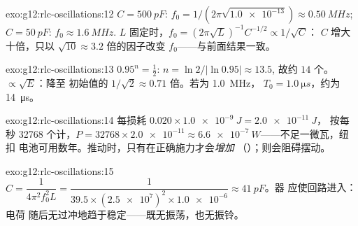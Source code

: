 \begin{solution}{exo:g12:rlc-oscillations:12}
$C = \qty{500}{pF}$: $f_0 = 1/(2\pi\sqrt{\num{1.0e-13}}) \approx
\qty{0.50}{MHz}$; $C = \qty{50}{pF}$: $f_0 \approx \qty{1.6}{MHz}$.
$L$ 固定时，$f_0 = (2\pi\sqrt{L})^{-1} C^{-1/2} \propto 1/\sqrt{C}$：
$C$ 增大十倍，只以 $\sqrt{10} \approx 3.2$ 倍的因子改变 $f_0$——与前面结果一致。
\end{solution}

\begin{solution}{exo:g12:rlc-oscillations:13}
$0.95^n = \tfrac12$: $n = \ln 2/\lvert\ln 0.95\rvert \approx 13.5$,
故约 $14$ 个。 $\propto \sqrt{E}$：降至
初始值的 $1/\sqrt{2} \approx 0.71$ 倍。若为 \qty{1.0}{MHz}，
$T_0 = \qty{1.0}{\micro s}$，约为 \qty{14}{\micro s}。
\end{solution}

\begin{solution}{exo:g12:rlc-oscillations:14}
每损耗 $0.020 \times \qty{1.0e-9}{J} = \qty{2.0e-11}{J}$，
按每秒 \num{32768} 个计，$P = \num{32768} \times \num{2.0e-11}
\approx \qty{6.6e-7}{W}$——不足一微瓦，纽扣
电池可用数年。推动时，只有在正确施力才会\emph{增加}
（）；则会阻碍摆动。
\end{solution}

\begin{solution}{exo:g12:rlc-oscillations:15}
$C = \dfrac{1}{4\pi^2 f_0^2 L} = \dfrac{1}{39.5 \times
(\num{2.5e7})^2 \times \num{1.0e-6}} \approx \qty{41}{pF}$。器
应使回路进入：电荷
随后无过冲地趋于稳定——既无振荡，也无振铃。
\end{solution}

